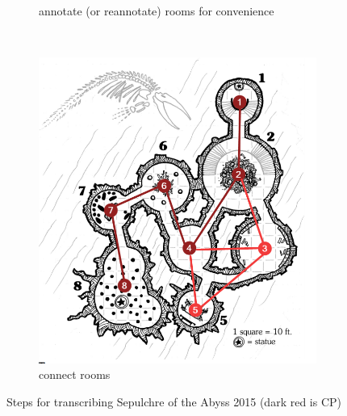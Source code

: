 \documentclass{UoYCSproject}
\begin{document}
\begin{figure}[htb]
\begin{subfigure}[b]{0.33\textwidth}
    \caption{annotate (or reannotate) rooms for convenience}
  \end{subfigure}
  ~
  \begin{subfigure}[b]{0.33\textwidth}
    \centering
    \includegraphics[width=\textwidth]{figures/step3.png}
    \caption{connect rooms}
  \end{subfigure}
  \caption{Steps for transcribing Sepulchre of the Abyss 2015 (dark red is CP)}
  \label{fig:SOTA}
\end{figure}
\end{document}
